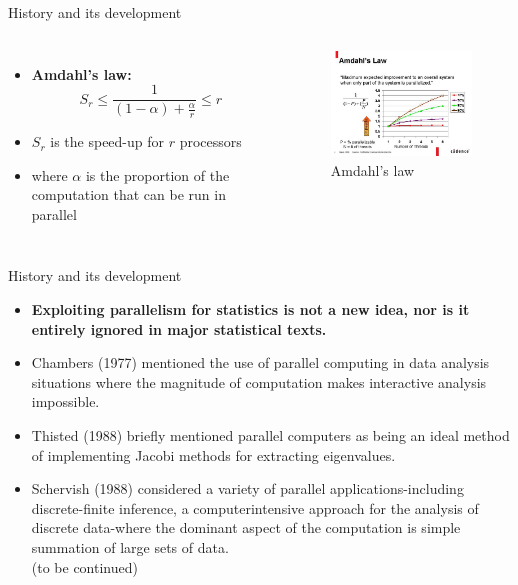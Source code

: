 \documentclass[10pt,aspectratio=169]{beamer}
\begin{document}
\begin{sloppypar}
\begin{frame}{History and its development}
	\begin{columns}      %
		\begin{itemize}
			\item {\bf{Amdahl's law:}}
		 \begin{equation}
			S_r \leq \frac{1}{(1-\alpha)+\frac{\alpha}{r}}\leq r   \nonumber
			\end{equation} 
			\item $S_r$ is the speed-up for $r$ processors
			\item where $\alpha$ is the proportion of the computation that can be run in parallel
		\end{itemize}
		
		\begin{figure}
			\centering
			\includegraphics[width=7cm]{picture//5} 
			\caption{Amdahl's law}
		\end{figure}
		
	\end{columns}
\end{frame}



\begin{frame}{History and its development} \par
{\color{blue}{Parallel processing for statistics: a review}}
\begin{itemize}
	\item {\bf{Exploiting parallelism for statistics is not a new idea, nor
			is it entirely ignored in major statistical texts.}}
	\item Chambers (1977) mentioned the use of parallel computing in data analysis situations where the magnitude of	computation makes interactive analysis impossible.
	\item Thisted (1988) briefly mentioned parallel computers as
	being an ideal method of implementing Jacobi methods
	for extracting eigenvalues. 
	\item Schervish (1988) considered a variety of parallel applications-including discrete-finite inference, a computerintensive approach for the analysis of discrete data-where
	the dominant aspect of the computation is simple summation
	of large sets of data.\\	
		(to be continued)
\end{itemize}
\end{frame}


\end{sloppypar}
\end{document}

